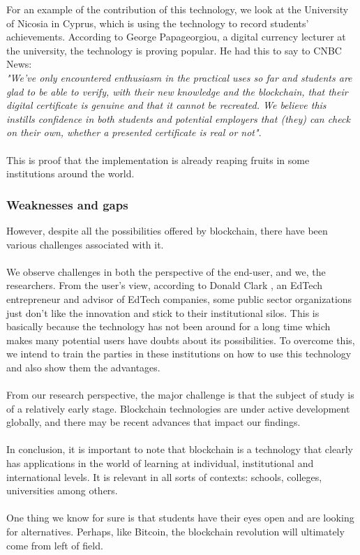For an example of the contribution of this technology, we look at the University of Nicosia in Cyprus, which is using the technology to record students' achievements. According to George Papageorgiou, a digital currency lecturer at the university, the technology is proving popular. He had this to say to CNBC News: \\ 
\textit{"We've only encountered enthusiasm in the practical uses so far and students are glad to be able to verify, with their new knowledge and the blockchain, that their digital certificate is genuine and that it cannot be recreated.
We believe this instills confidence in both students and potential employers that (they) can check on their own, whether a presented certificate is real or not"}.\cite{art5} \\ \\
This is proof that the implementation is already reaping fruits in some institutions around the world.



\subsubsection{Weaknesses and gaps}

However, despite all the possibilities offered by blockchain, there have been various challenges associated with it. \\ \\
We observe challenges in both the perspective of the end-user, and we, the researchers. From the user’s view, according to Donald Clark \cite{art6}, an EdTech entrepreneur and advisor of EdTech companies, some public sector organizations just don’t like the innovation and stick to their institutional silos. This is basically because the technology has not been around for a long time which makes many potential users have doubts about its possibilities. To overcome this, we intend to train the parties in these institutions on how to use this technology and also show them the advantages. \\ \\
From our research perspective, the major challenge is that the subject of study is of a relatively early stage. Blockchain technologies are under active development globally, and there may be recent advances that impact our findings. \\ \\

In conclusion, it is important to note that blockchain is a technology that clearly has applications in the world of learning at individual, institutional and international levels. It is relevant in all sorts of contexts: schools, colleges, universities among others. \\ \\
One thing we know for sure is that students have their eyes open and are looking for alternatives. Perhaps, like Bitcoin, the blockchain revolution will ultimately come from left of field.\\ \\

\newpage


